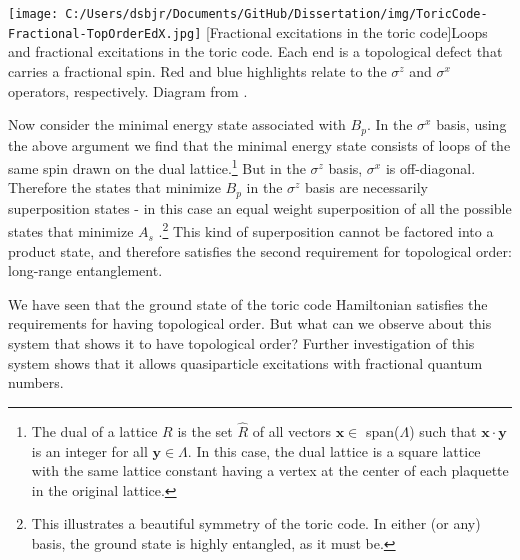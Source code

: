 \begin{centering}
\texttt{[image: C:/Users/dsbjr/Documents/GitHub/Dissertation/img/ToricCode-Fractional-TopOrderEdX.jpg]}
  \captionsetup{width=0.75\textwidth}
  [Fractional excitations in the toric code]{Loops and fractional excitations in the toric code. Each end is a topological defect that carries a fractional spin. Red and blue highlights relate to the $\sigma^{z}$ and $\sigma^{x}$ operators, respectively. Diagram from \cite{topOrderEdX}.}
  \label{fig:toricCode2}
\end{centering}

Now consider the minimal energy state associated with $B_{p}$. In the $\sigma^{x}$ basis, using the above argument we find that the minimal energy state consists of loops of the same spin drawn on the dual lattice.\footnote{The dual of a lattice $R$ is the set $\hat{R}$ of all vectors $\mathbf{x} \in$ span($\Lambda$) such that $\mathbf{x} \cdot \mathbf{y}$ is an integer for all $\mathbf{y} \in \Lambda$. In this case, the dual lattice is a square lattice with the same lattice constant having a vertex at the center of each plaquette in the original lattice.} But in the $\sigma^{z}$ basis, $\sigma^{x}$ is off-diagonal. Therefore the states that minimize $B_{p}$ in the $\sigma^{z}$ basis are necessarily superposition states - in this case an equal weight superposition of all the possible states that minimize $A_{s}$ \cite{Savary2017}.\footnote{This illustrates a beautiful symmetry of the toric code. In either (or any) basis, the ground state is highly entangled, as it must be.} This kind of superposition cannot be factored into a product state, and therefore satisfies the second requirement for topological order: long-range entanglement.

We have seen that the ground state of the toric code Hamiltonian satisfies the requirements for having topological order. But what can we observe about this system that shows it to have topological order? Further investigation of this system shows that it allows quasiparticle excitations with fractional quantum numbers.

